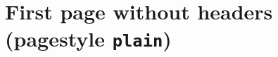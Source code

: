 \documentclass{article}
\begin{document}
\thispagestyle{plain}

\section*{First page without headers (pagestyle \texttt{plain})}
\label{sec:first-page-without}


\lipsum
\end{document}
